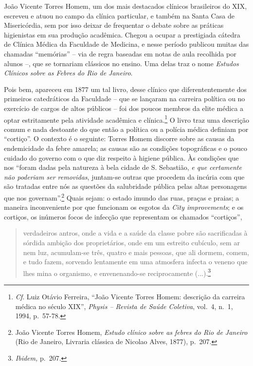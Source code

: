 João Vicente Torres Homem, um dos mais destacados clínicos brasileiros
do XIX, escreveu e atuou no campo da clínica particular, e também na
Santa Casa de Misericórdia, sem por isso deixar de frequentar o debate
sobre as práticas higienistas em sua produção acadêmica. Chegou a ocupar
a prestigiada cátedra de Clínica Médica da Faculdade de Medicina, e
nesse período publicou muitas das chamadas ``memórias'' -- via de regra
baseadas em notas de aula recolhida por alunos --, que se tornariam
clássicos no ensino. Uma delas traz o nome \emph{Estudos Clínicos sobre
as Febres do Rio de Janeiro}.

Pois bem, apareceu em 1877 um tal livro, desse clínico que
diferententemente dos primeiros catedráticos da Faculdade -- que se
lançaram na carreira política ou no exercício de cargos de altos
públicos -- foi dos poucos membros da elite médica a optar estritamente
pela atividade acadêmica e clínica.\footnote{\emph{Cf}. Luiz Otávio
  Ferreira, ``João Vicente Torres Homem: descrição da carreira médica no
  século XIX'', \emph{Physis -- Revista de Saúde Coletiva}, vol.~4,
  n.~1, 1994, p.~57-78.} O livro traz uma descrição comum e nada
destoante do que então a política ou a polícia médica definiam por
``cortiço''. O contexto é o seguinte: Torres Homem discorre sobre as
causas da endemicidade da febre amarela; as causas são as condições
topográficas e o pouco cuidado do governo com o que diz respeito à
higiene pública. Às condições que nos ``foram dadas pela natureza à bela
cidade de S. Sebastião, \emph{e que certamente não poderiam ser
removidas}, juntam-se outras que procedem da incúria com que são
tratadas entre nós as questões da salubridade pública pelas altas
personagens que nos governam''.\footnote{João Vicente Torres Homem,
  \emph{Estudo clínico sobre as febres do Rio de Janeiro} (Rio de
  Janeiro, Livraria clássica de Nicolao Alves, 1877), p.~207.} Quais
sejam: o estado imundo das ruas, praças e praias; a maneira
inconveniente por que funcionam os esgotos da \emph{City improvements};
e os cortiços, os inúmeros focos de infecção que representam os chamados
``cortiços'',

\begin{quote}
verdadeiros antros, onde a vida e a saúde da classe pobre são
sacrificadas à sórdida ambição dos proprietários, onde em um estreito
cubículo, sem ar nem luz, acumulam-se três, quatro e mais pessoas, que
ali dormem, comem, e tudo fazem, sorvendo lentamente em uma atmosfera
infecta o veneno que lhes mina o organismo, e envenenando-se
reciprocamente (...).\footnote{\emph{Ibidem,} p.~207.}
\end{quote}

